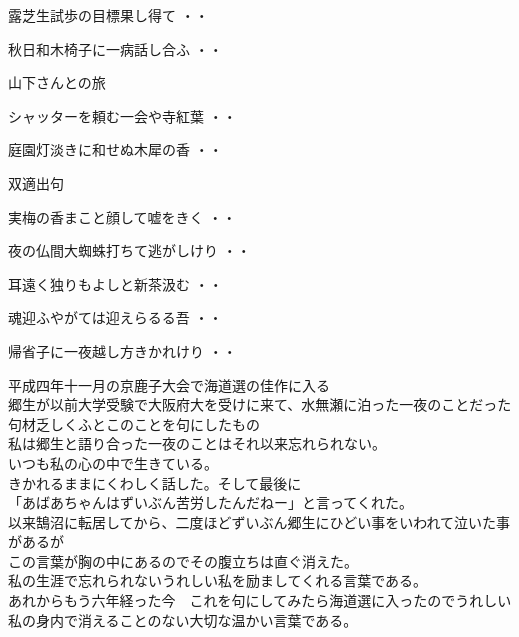 \begin{shiika}露芝生試歩の目標果し得て
\hfill{・・}\end{shiika}
\begin{shiika}秋日和木椅子に一病話し合ふ
\hfill{・・}\end{shiika}
\vspace{0.4cm}
山下さんとの旅
\begin{shiika}シャッターを頼む一会や寺紅葉
\hfill{・・}\end{shiika}
\begin{shiika}庭園灯淡きに和せぬ木犀の香
\hfill{・・}\end{shiika}
\vspace{0.4cm}
双適出句
\begin{shiika}実梅の香まこと顔して嘘をきく
\hfill{・・}\end{shiika}
\begin{shiika}夜の仏間大蜘蛛打ちて逃がしけり
\hfill{・・}\end{shiika}
\begin{shiika}耳遠く独りもよしと新茶汲む
\hfill{・・}\end{shiika}
\begin{shiika}魂迎ふやがては迎えらるる吾
\hfill{・・}\end{shiika}
\begin{shiika}帰省子に一夜越し方きかれけり
\hfill{・・}\end{shiika}
\qquad\qquad\qquad 平成四年十一月の京鹿子大会で海道選の佳作に入る\\
\qquad\qquad\qquad 郷生が以前大学受験で大阪府大を受けに来て、水無瀬に泊った一夜のことだった\\
\qquad\qquad\qquad 句材乏しくふとこのことを句にしたもの\\
\qquad\qquad\qquad 私は郷生と語り合った一夜のことはそれ以来忘れられない。\\
\qquad\qquad\qquad いつも私の心の中で生きている。\\
\qquad\qquad\qquad きかれるままにくわしく話した。そして最後に\\
\qquad\qquad\qquad「あばあちゃんはずいぶん苦労したんだねー」と言ってくれた。\\
\qquad\qquad\qquad 以来鵠沼に転居してから、二度ほどずいぶん郷生にひどい事をいわれて泣いた事があるが\\
\qquad\qquad\qquad この言葉が胸の中にあるのでその腹立ちは直ぐ消えた。\\
\qquad\qquad\qquad 私の生涯で忘れられないうれしい私を励ましてくれる言葉である。\\
\qquad\qquad\qquad あれからもう六年経った今　これを句にしてみたら海道選に入ったのでうれしい\\
\qquad\qquad\qquad 私の身内で消えることのない大切な温かい言葉である。\\

